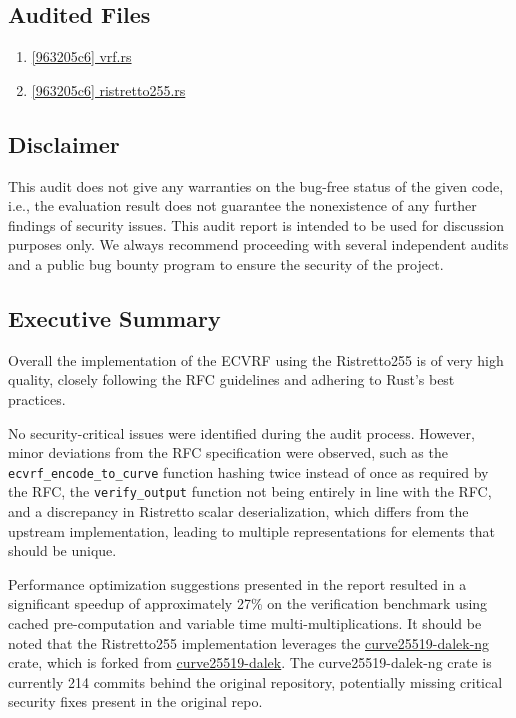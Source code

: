 \subsection{Audited Files} 
\begin{enumerate}
    \item{\href{https://github.com/MystenLabs/fastcrypto/blob/963205c6d0538fe548b8b10037cf87a53af6f424/fastcrypto/src/vrf.rs}{[963205c6] vrf.rs}}
    \item{\href{https://github.com/MystenLabs/fastcrypto/blob/main/fastcrypto/src/groups/ristretto255.rs}{[963205c6] ristretto255.rs}}
\end{enumerate}

\subsection{Disclaimer}
This audit does not give any warranties on the bug-free status of the given code, i.e., the evaluation result does not guarantee the nonexistence of any further findings of security issues. This audit report is intended to be used for discussion purposes only. We always recommend proceeding with several independent audits and a public bug bounty program to ensure the security of the project.

\subsection{Executive Summary}
Overall the implementation of the ECVRF using the Ristretto255 is of very high quality, closely following the RFC guidelines and adhering to Rust's best practices.

No security-critical issues were identified during the audit process. However, minor deviations from the RFC specification were observed, such as the \lstinline{ecvrf_encode_to_curve} function hashing twice instead of once as required by the RFC, the \lstinline{verify_output} function not being entirely in line with the RFC, and a discrepancy in Ristretto scalar deserialization, which differs from the upstream implementation, leading to multiple representations for elements that should be unique.

Performance optimization suggestions presented in the report resulted in a significant speedup of approximately 27\% on the verification benchmark using cached pre-computation and variable time multi-multiplications. It should be noted that the Ristretto255 implementation leverages the \href{https://github.com/zkcrypto/curve25519-dalek-ng}{curve25519-dalek-ng} crate, which is forked from \href{https://github.com/dalek-cryptography/curve25519-dalek}{curve25519-dalek}. The curve25519-dalek-ng crate is currently 214 commits behind the original repository, potentially missing critical security fixes present in the original repo.

